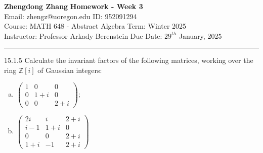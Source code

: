 \documentclass[a4paper, 12pt]{article}
\begin{document}
\noindent
\large\textbf{Zhengdong Zhang} \hfill \textbf{Homework - Week 3}   \\
Email: zhengz@uoregon.edu \hfill ID: 952091294 \\
\normalsize Course: MATH 648 - Abstract Algebra  \hfill Term: Winter 2025\\
Instructor: Professor Arkady Berenstein \hfill Due Date: $29^{th}$ January, 2025 \\
\noindent\rule{7in}{2.8pt}
\begin{problem}{15.1.5}
Calculate the invariant factors of the following matrices, working over the ring \(\mathbb{Z}[i]\) of Gaussian integers:
\begin{multicols}{2}
\begin{enumerate}[(a)]
\item \(\begin{pmatrix}
    1&0&0\\ 
    0&1+i&0\\ 
    0&0&2+i
\end{pmatrix};\)
\item \(\begin{pmatrix}
    2i&i&2+i\\ 
    i-1&1+i&0\\ 
    0&0&2+i\\ 
    1+i&-1&2+i
\end{pmatrix}\)
\end{enumerate}
\end{multicols}
\end{problem}
\end{document}
